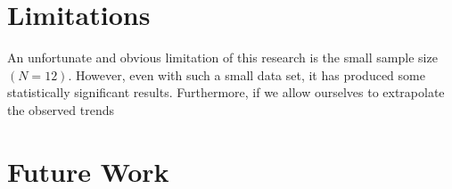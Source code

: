 \section{Limitations}
    An unfortunate and obvious limitation of this research is the small sample size $(N=12)$. %
However, even with such a small data set, it has produced some statistically significant results. %
Furthermore, if we allow ourselves to extrapolate the observed trends 

        
\section{Future Work}
